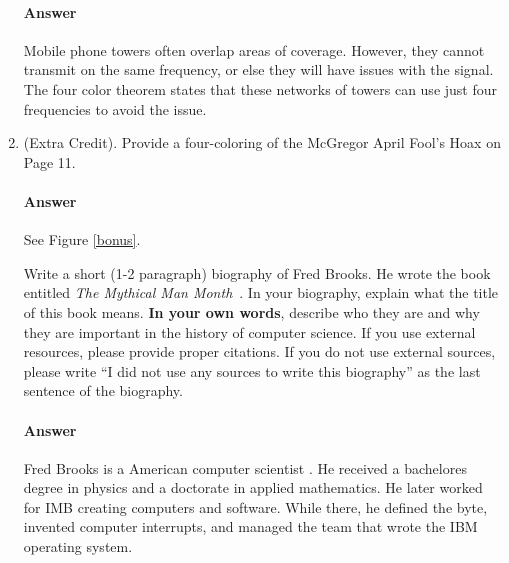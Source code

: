 \documentclass{article}
\begin{document}
\begin{enumerate}
        \paragraph{Answer}
        Mobile phone towers often overlap areas of coverage. However, they 
	cannot transmit on the same frequency, or else they will have issues with the signal. 
	The four color theorem states that these networks of towers can use just four 
	frequencies to avoid the issue.

    \item (Extra Credit). Provide a four-coloring of the McGregor April Fool's
        Hoax on Page 11.

 	\paragraph{Answer} See Figure \ref{bonus}.




Write a short (1-2 paragraph) biography of Fred Brooks.  He wrote the book
entitled \emph{The Mythical Man Month}~\cite{brooks-manmonth}.  In your
biography, explain what the title of this book means.
\textbf{In your own words}, describe who they are and why they are important in
the history of computer science.  If you use external resources, please provide
proper citations. If you do not use external sources, please write ``I did not
use any sources to write this biography'' as the last sentence of the
biography.

\paragraph{Answer}

Fred Brooks is a American computer scientist . He received a bachelores degree
 in physics and a doctorate in applied mathematics. He later worked for IMB 
creating computers and software. While there, he defined the byte, invented 
computer interrupts, and managed the team that wrote the IBM operating system. 


\end{enumerate}
\end{document}
